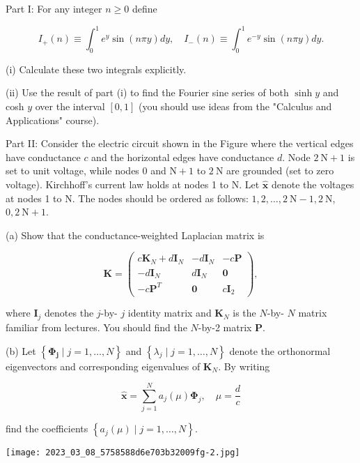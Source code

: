 \documentclass[10pt, a4paper]{article}
\begin{document}
\newpage
\begin{Problem}
Part I: For any integer $n \geq 0$ define

$$
I_{+}(n) \equiv \int_{0}^{1} e^{y} \sin (n \pi y) d y, \quad I_{-}(n) \equiv \int_{0}^{1} e^{-y} \sin (n \pi y) d y .
$$

(i) Calculate these two integrals explicitly.

(ii) Use the result of part (i) to find the Fourier sine series of both $\sinh y$ and cosh $y$ over the interval $[0,1]$ (you should use ideas from the "Calculus and Applications" course).

Part II: Consider the electric circuit shown in the Figure where the vertical edges have conductance $c$ and the horizontal edges have conductance $d$. Node $2 \mathrm{~N}+1$ is set to unit voltage, while nodes 0 and $\mathrm{N}+1$ to $2 \mathrm{~N}$ are grounded (set to zero voltage). Kirchhoff's current law holds at nodes 1 to $\mathrm{N}$. Let $\hat{\mathbf{x}}$ denote the voltages at nodes 1 to $\mathrm{N}$. The nodes should be ordered as follows: $1,2, \ldots, 2 \mathrm{~N}-1,2 \mathrm{~N}$, $0,2 \mathrm{~N}+1$.

(a) Show that the conductance-weighted Laplacian matrix is

$$
\mathbf{K}=\left(\begin{array}{ccc}
c \mathbf{K}_{N}+d \mathbf{I}_{N} & -d \mathbf{I}_{N} & -c \mathbf{P} \\
-d \mathbf{I}_{N} & d \mathbf{I}_{N} & \mathbf{0} \\
-c \mathbf{P}^{T} & \mathbf{0} & c \mathbf{I}_{2}
\end{array}\right),
$$

where $\mathbf{I}_{j}$ denotes the $j$-by- $j$ identity matrix and $\mathbf{K}_{N}$ is the $N$-by- $N$ matrix familiar from lectures. You should find the $N$-by-2 matrix $\mathbf{P}$.

(b) Let $\left\{\boldsymbol{\Phi}_{\mathbf{j}} \mid j=1, \ldots, N\right\}$ and $\left\{\lambda_{j} \mid j=1, \ldots, N\right\}$ denote the orthonormal eigenvectors and corresponding eigenvalues of $\mathbf{K}_{N}$. By writing

$$
\hat{\mathbf{x}}=\sum_{j=1}^{N} a_{j}(\mu) \boldsymbol{\Phi}_{j}, \quad \mu=\frac{d}{c}
$$

find the coefficients $\left\{a_{j}(\mu) \mid j=1, \ldots, N\right\}$.

\begin{center}
\texttt{[image: 2023\_03\_08\_5758588d6e703b32009fg-2.jpg]}
\end{center}


\end{Problem}
\end{document}
